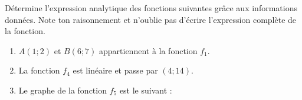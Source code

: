\documentclass[a4paper, 12pt, parskip=half-]{scrartcl}
\begin{document}
\begin{exercise}[points=6]
    Détermine l'expression analytique des fonctions suivantes grâce aux informations données. Note ton raisonnement et n'oublie pas d'écrire l'expression complète de la fonction.
    \begin{enumerate}
        \item
              $A(1;2)$ et $B(6;7)$ appartiennent à la fonction $f_1$.
        \item
              La fonction $f_4$ est linéaire et passe par $(4;14)$.
        \item
              Le graphe de la fonction $f_5$ est le suivant : \hfil 
    \end{enumerate}
\end{exercise}
\end{document}
